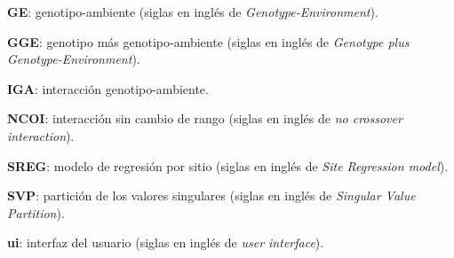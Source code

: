 \begin{spacing}{1}
\begin{description}
\item{\textbf{GE}}: genotipo-ambiente (siglas en inglés de \emph{Genotype-Environment}).

\item{\textbf{GGE}}: genotipo más genotipo-ambiente (siglas en inglés de \emph{Genotype plus Genotype-Environment}).

\item{\textbf{IGA}}: interacción genotipo-ambiente.

\item{\textbf{NCOI}}: interacción sin cambio de rango (siglas en inglés de \emph{no crossover interaction}).

\item{\textbf{SREG}}: modelo de regresión por sitio (siglas en inglés de \emph{Site Regression model}).

\item{\textbf{SVP}}: partición de los valores singulares (siglas en inglés de \emph{Singular Value Partition}).

\item{\textbf{ui}}: interfaz del usuario (siglas en inglés de \emph{user interface}).


\end{description}
\end{spacing}